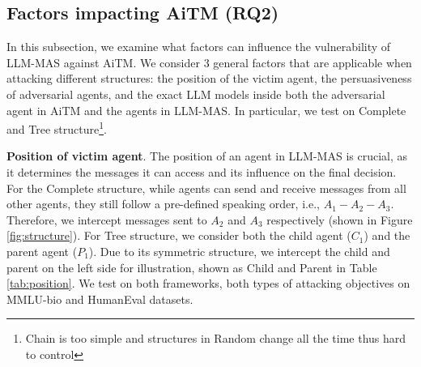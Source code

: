 
\subsection{Factors impacting AiTM (RQ2)}

In this subsection, we examine what factors can influence the vulnerability of LLM-MAS against AiTM. We consider 3 general factors that are applicable when attacking different structures: the position of the victim agent, the persuasiveness of adversarial agents, and the exact LLM models inside both the adversarial agent in AiTM and the agents in LLM-MAS. In particular, we test on Complete and Tree structure\footnote{Chain is too simple and structures in Random change all the time thus hard to control}.

\noindent\textbf{Position of victim agent}. The position of an agent in LLM-MAS is crucial, as it determines the messages it can access and its influence on the final decision. For the Complete structure, while agents can send and receive messages from all other agents, they still follow a pre-defined speaking order, i.e., $A_1 - A_2 - A_3$. Therefore, we intercept messages sent to $A_2$ and $A_3$ respectively (shown in Figure \ref{fig:structure}). For Tree structure, we consider both the child agent ($C_1$) and the parent agent ($P_1$). Due to its symmetric structure, we intercept the child and parent on the left side for illustration, shown as Child and Parent in Table \ref{tab:position}. We test on both frameworks, both types of attacking objectives on MMLU-bio and HumanEval datasets. 

